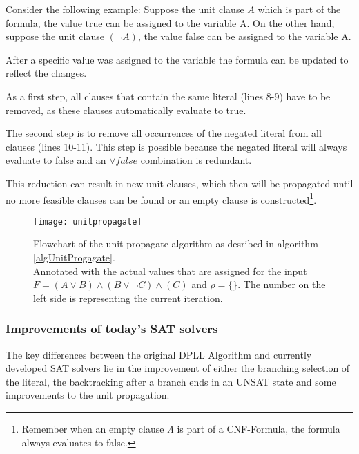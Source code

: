 Consider the following example: Suppose the unit clause $A$ which is part of the formula, the value true can be assigned to the variable A. On the other hand, suppose the unit clause $(\lnot A)$, the value false can be assigned to the variable A.

After a specific value was assigned to the variable the formula can be updated to reflect the changes. 

As a first step, all clauses that contain the same literal (lines 8-9) have to be removed, as these clauses automatically evaluate to true. 

The second step is to remove all occurrences of the negated literal from all clauses (lines 10-11). This step is possible because the negated literal will always evaluate to false and an $\lor false$ combination is redundant.

This reduction can result in new unit clauses, which then will be propagated until no more feasible clauses can be found or an empty clause is constructed\footnote{Remember when an empty clause $\Lambda$ is part of a CNF-Formula, the formula always evaluates to false.}.

\begin{figure}[H]
\texttt{[image: unitpropagate]}
\centering
\caption{Flowchart of the unit propagate algorithm as desribed in algorithm \ref{algUnitProgagate}.\\ Annotated with the actual values that are assigned for the input $F=(A \lor B ) \land (B \lor \lnot C) \land (C)$ and $\rho = \{\}$. The number on the left side is representing the current iteration.}
\label{fig:unitpropagate}
\end{figure}


\subsubsection{Improvements of today's SAT solvers}
The key differences between the original DPLL Algorithm and currently developed SAT solvers lie in the improvement of either the branching selection of the literal, the backtracking after a branch ends in an UNSAT state and some improvements to the unit propagation.
